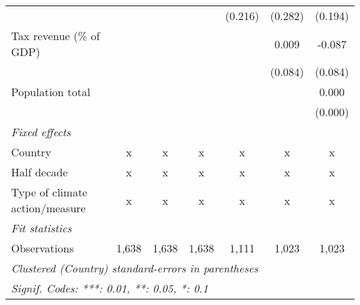 \begin{tabular}{lcccccc}
                                                        &         &              &                & (0.216)        & (0.282)        & (0.194)\\   
   Tax revenue (\% of GDP)                              &         &              &                &                & 0.009          & -0.087\\   
                                                        &         &              &                &                & (0.084)        & (0.084)\\   
   Population total                                     &         &              &                &                &                & 0.000\\   
                                                        &         &              &                &                &                & (0.000)\\   
   \emph{Fixed effects}\\
   Country                                              & x       & x            & x              & x              & x              & x\\  
   Half decade                                          & x       & x            & x              & x              & x              & x\\  
   Type of climate action/measure                       & x       & x            & x              & x              & x              & x\\  
   \midrule \emph{Fit statistics}\\
   Observations                                         & 1,638   & 1,638        & 1,638          & 1,111          & 1,023          & 1,023\\  
   \midrule
   \multicolumn{7}{l}{\emph{Clustered (Country) standard-errors in parentheses}}\\
   \multicolumn{7}{l}{\emph{Signif. Codes: ***: 0.01, **: 0.05, *: 0.1}}\\
\end{tabular}
\par\endgroup


